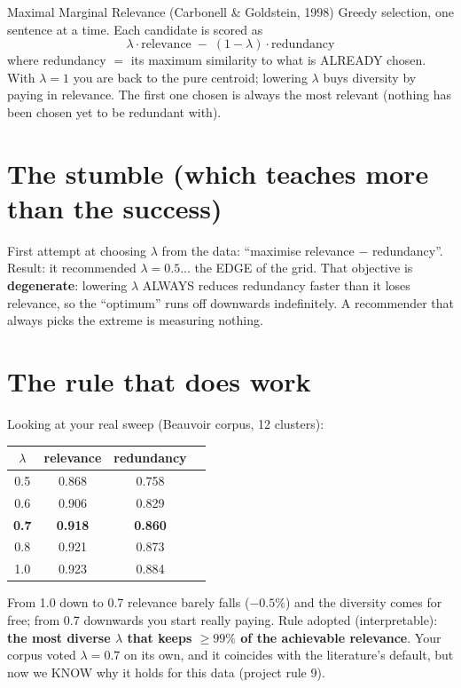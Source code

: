 \documentclass[11pt,a4paper]{article}
\begin{document}
\begin{concepto}{Maximal Marginal Relevance (Carbonell \& Goldstein, 1998)}
Greedy selection, one sentence at a time. Each candidate is scored as
\[
\lambda \cdot \mathrm{relevance} \;-\; (1-\lambda) \cdot \mathrm{redundancy}
\]
where redundancy $=$ its maximum similarity to what is ALREADY chosen. With $\lambda = 1$ you
are back to the pure centroid; lowering $\lambda$ buys diversity by paying in relevance. The
first one chosen is always the most relevant (nothing has been chosen yet to be redundant
with).
\end{concepto}

\section{The stumble (which teaches more than the success)}

First attempt at choosing $\lambda$ from the data: ``maximise relevance $-$ redundancy''.
Result: it recommended $\lambda = 0.5$... the EDGE of the grid. That objective is
\textbf{degenerate}: lowering $\lambda$ ALWAYS reduces redundancy faster than it loses
relevance, so the ``optimum'' runs off downwards indefinitely. A recommender that always picks
the extreme is measuring nothing.

\section{The rule that does work}

Looking at your real sweep (Beauvoir corpus, 12 clusters):

\begin{center}
\begin{tabular}{cccc}
$\lambda$ & relevance & redundancy \\
\hline
0.5 & 0.868 & 0.758 \\
0.6 & 0.906 & 0.829 \\
\textbf{0.7} & \textbf{0.918} & \textbf{0.860} \\
0.8 & 0.921 & 0.873 \\
1.0 & 0.923 & 0.884 \\
\end{tabular}
\end{center}

From 1.0 down to 0.7 relevance barely falls ($-0.5\%$) and the diversity comes for free; from
0.7 downwards you start really paying. Rule adopted (interpretable): \textbf{the most diverse
$\lambda$ that keeps $\geq 99\%$ of the achievable relevance}. Your corpus voted $\lambda = 0.7$
on its own, and it coincides with the literature's default, but now we KNOW why it holds for
this data (project rule 9).
\end{document}
